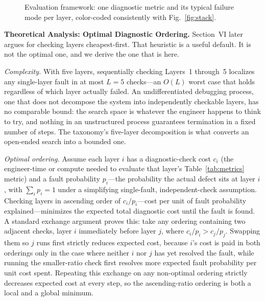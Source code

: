 \documentclass[journal]{IEEEtran}
\begin{document}
\begin{figure}[t]
\caption{Evaluation framework: one diagnostic metric and its typical failure mode per layer, color-coded consistently with Fig.~\ref{fig:stack}.}
\label{fig:eval}
\end{figure}

\textbf{Theoretical Analysis: Optimal Diagnostic Ordering.} Section~VI later argues for checking layers cheapest-first. That heuristic is a useful default. It is not the optimal one, and we derive the one that is here.

\emph{Complexity.} With five layers, sequentially checking Layers~1 through~5 localizes any single-layer fault in at most $L=5$ checks---an $O(L)$ worst case that holds regardless of which layer actually failed. An undifferentiated debugging process, one that does not decompose the system into independently checkable layers, has no comparable bound: the search space is whatever the engineer happens to think to try, and nothing in an unstructured process guarantees termination in a fixed number of steps. The taxonomy's five-layer decomposition is what converts an open-ended search into a bounded one.

\emph{Optimal ordering.} Assume each layer $i$ has a diagnostic-check cost $c_i$ (the engineer-time or compute needed to evaluate that layer's Table~\ref{tab:metrics} metric) and a fault probability $p_i$---the probability the actual defect sits at layer $i$, with $\sum_i p_i = 1$ under a simplifying single-fault, independent-check assumption. Checking layers in ascending order of $c_i/p_i$---cost per unit of fault probability explained---minimizes the expected total diagnostic cost until the fault is found. A standard exchange argument proves this: take any ordering containing two adjacent checks, layer $i$ immediately before layer $j$, where $c_i/p_i > c_j/p_j$. Swapping them so $j$ runs first strictly reduces expected cost, because $i$'s cost is paid in both orderings only in the case where neither $i$ nor $j$ has yet resolved the fault, while running the smaller-ratio check first resolves more expected fault probability per unit cost spent. Repeating this exchange on any non-optimal ordering strictly decreases expected cost at every step, so the ascending-ratio ordering is both a local and a global minimum.
\end{document}
